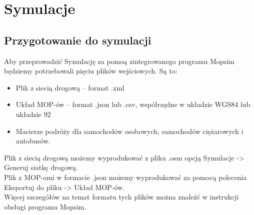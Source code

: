 \documentclass[10pt,paper=a4 BCOR0, DIV15, titlepage=false, oneside]{scrbook} %
\begin{document}
    \chapter*{Symulacje}
    \addtocounter{chapter}{1}
    \setcounter{section}{0}
    
    \section{Przygotowanie do symulacji}
    Aby przeprowadzić Symulację za pomoą zintegrowanego programu Mopsim będziemy potrzebowali pięciu plików wejściowych. Są to: \begin{itemize}
    \item Plik z siecią drogową -- format .xml
    \item Układ MOP-ów -- format .json lub .csv, współrzędne w układzie WGS84 lub układzie 92
    \item Macierze podróży dla samochodów osobowych, samochodów ciężarowych i autobusów.
\end{itemize}
Plik z siecią drogową możemy wyprodukować z pliku .osm opcją Symulacje -> Generuj siatkę drogową.\\
Plik z MOP-ami w formacie .json możemy wyprodukować za pomocą polecenia Eksportuj do pliku -> Układ MOP-ów.\\
Więcej szczegółów na temat formatu tych plików można znaleźć w instrukcji obsługi programu Mopsim.
\end{document}
